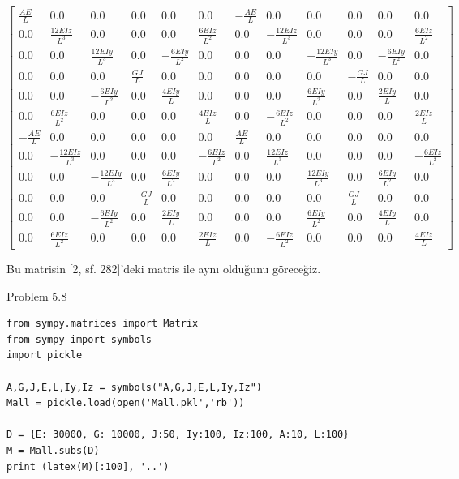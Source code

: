 \documentclass[12pt,fleqn]{article}\usepackage{../../common}
\begin{document}
$$
\left[\begin{array}{cccccccccccc}\frac{A E}{L} & 0.0 & 0.0 & 0.0 & 0.0 & 0.0 & - \frac{A E}{L} & 0.0 & 0.0 & 0.0 & 0.0 & 0.0\\0.0 & \frac{12 E Iz}{L^{3}} & 0.0 & 0.0 & 0.0 & \frac{6 E Iz}{L^{2}} & 0.0 & - \frac{12 E Iz}{L^{3}} & 0.0 & 0.0 & 0.0 & \frac{6 E Iz}{L^{2}}\\0.0 & 0.0 & \frac{12 E Iy}{L^{3}} & 0.0 & - \frac{6 E Iy}{L^{2}} & 0.0 & 0.0 & 0.0 & - \frac{12 E Iy}{L^{3}} & 0.0 & - \frac{6 E Iy}{L^{2}} & 0.0\\0.0 & 0.0 & 0.0 & \frac{G J}{L} & 0.0 & 0.0 & 0.0 & 0.0 & 0.0 & - \frac{G J}{L} & 0.0 & 0.0\\0.0 & 0.0 & - \frac{6 E Iy}{L^{2}} & 0.0 & \frac{4 E Iy}{L} & 0.0 & 0.0 & 0.0 & \frac{6 E Iy}{L^{2}} & 0.0 & \frac{2 E Iy}{L} & 0.0\\0.0 & \frac{6 E Iz}{L^{2}} & 0.0 & 0.0 & 0.0 & \frac{4 E Iz}{L} & 0.0 & - \frac{6 E Iz}{L^{2}} & 0.0 & 0.0 & 0.0 & \frac{2 E Iz}{L}\\- \frac{A E}{L} & 0.0 & 0.0 & 0.0 & 0.0 & 0.0 & \frac{A E}{L} & 0.0 & 0.0 & 0.0 & 0.0 & 0.0\\0.0 & - \frac{12 E Iz}{L^{3}} & 0.0 & 0.0 & 0.0 & - \frac{6 E Iz}{L^{2}} & 0.0 & \frac{12 E Iz}{L^{3}} & 0.0 & 0.0 & 0.0 & - \frac{6 E Iz}{L^{2}}\\0.0 & 0.0 & - \frac{12 E Iy}{L^{3}} & 0.0 & \frac{6 E Iy}{L^{2}} & 0.0 & 0.0 & 0.0 & \frac{12 E Iy}{L^{3}} & 0.0 & \frac{6 E Iy}{L^{2}} & 0.0\\0.0 & 0.0 & 0.0 & - \frac{G J}{L} & 0.0 & 0.0 & 0.0 & 0.0 & 0.0 & \frac{G J}{L} & 0.0 & 0.0\\0.0 & 0.0 & - \frac{6 E Iy}{L^{2}} & 0.0 & \frac{2 E Iy}{L} & 0.0 & 0.0 & 0.0 & \frac{6 E Iy}{L^{2}} & 0.0 & \frac{4 E Iy}{L} & 0.0\\0.0 & \frac{6 E Iz}{L^{2}} & 0.0 & 0.0 & 0.0 & \frac{2 E Iz}{L} & 0.0 & - \frac{6 E Iz}{L^{2}} & 0.0 & 0.0 & 0.0 & \frac{4 E Iz}{L}\end{array}\right]
$$

Bu matrisin [2, sf. 282]'deki matris ile aynı olduğunu göreceğiz.

Problem 5.8

\begin{verbatim}
from sympy.matrices import Matrix
from sympy import symbols
import pickle

A,G,J,E,L,Iy,Iz = symbols("A,G,J,E,L,Iy,Iz")
Mall = pickle.load(open('Mall.pkl','rb'))

D = {E: 30000, G: 10000, J:50, Iy:100, Iz:100, A:10, L:100}
M = Mall.subs(D)
print (latex(M)[:100], '..')
\end{verbatim}
\end{document}
